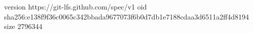 version https://git-lfs.github.com/spec/v1
oid sha256:e138f9f36c0065c342bbada9677073f6b0d7db1e7188cdaa3d6511a2ff4d8194
size 2796344
